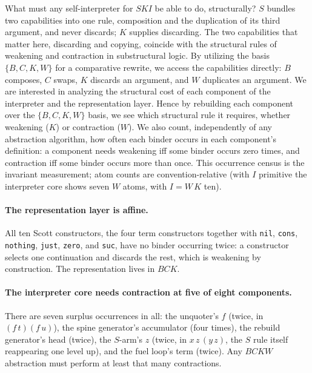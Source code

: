 \documentclass[review]{jfp-epi}
\begin{document}
What must any self-interpreter for $SKI$ be able to do, structurally?
$S$ bundles two capabilities into one rule, composition and the
duplication of its third argument, and never discards; $K$ supplies
discarding.  The two capabilities that matter here, discarding and
copying, coincide with the structural rules of weakening and contraction
in substructural logic.
By utilizing the basis $\{B, C, K, W\}$ for a comparative rewrite, we
access the capabilities directly: $B$ composes, $C$ swaps, $K$ discards
an argument, and $W$ duplicates an argument.  We are interested in
analyzing the structural cost of each component of the interpreter and
the representation layer.  Hence by rebuilding each component
over the $\{B, C, K, W\}$ basis, we see which structural rule it
requires, whether weakening ($K$) or contraction ($W$). We also count,
independently of any abstraction algorithm, how often each binder occurs
in each component's definition: a component needs weakening iff some
binder occurs zero times, and contraction iff some binder occurs more
than once. This occurrence census is the invariant measurement; atom
counts are convention-relative (with $I$ primitive the interpreter core
shows seven $W$ atoms, with $I = W\,K$ ten).

\paragraph{The representation layer is affine.} All ten Scott
constructors, the four term constructors together with \texttt{nil},
\texttt{cons}, \texttt{nothing}, \texttt{just}, \texttt{zero}, and
\texttt{suc}, have no binder occurring twice: a constructor selects one
continuation and discards the rest, which is weakening by construction.
The representation lives in $BCK$.

\paragraph{The interpreter core needs contraction at five of eight
components.} There are seven surplus occurrences in all: the unquoter's
$f$ (twice, in $(f\,t)(f\,u)$), the spine generator's accumulator (four
times), the rebuild generator's head (twice), the $S$-arm's $z$ (twice,
in $x\,z\,(y\,z)$, the $S$ rule itself reappearing one level up), and the
fuel loop's term (twice). Any $BCKW$ abstraction must perform at least
that many contractions.
\end{document}

